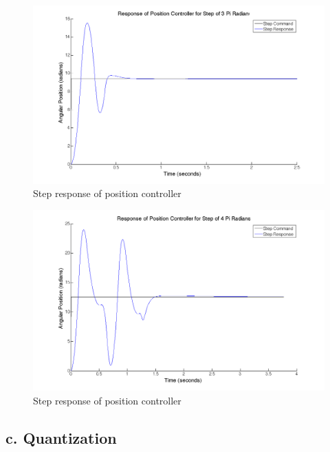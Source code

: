 \documentclass{article}
\theoremstyle{plain}
\theoremstyle{definition}
\theoremstyle{remark}
\begin{document}
\begin{figure}[htb]
\begin{center}
\includegraphics[width = 14cm]{posstep_3pi.png}
\caption{Step response of position controller}
\label{q5_b4}
\end{center}
\end{figure}

\begin{figure}[htb]
\begin{center}
\includegraphics[width = 14cm]{posstep_4pi.png}
\caption{Step response of position controller}
\label{q5_b5}
\end{center}
\end{figure}

\subsection*{c. Quantization}

\clearpage
\end{document}
